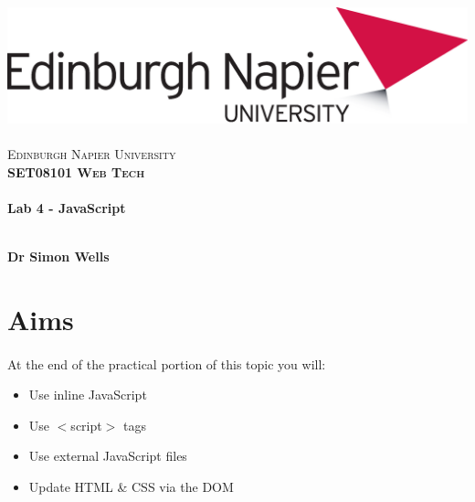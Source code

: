 \documentclass[10pt, a4paper, twosize]{article}
\begin{document}

\begin{titlepage}
\vspace*{5cm}
\begin{center}
\includegraphics[width=.5\textwidth]{images/EdNapUniLogoCMYK}~\\[1cm]

\textsc{\Large Edinburgh Napier University}\\[1.5cm]

\textsc{\LARGE \bfseries SET08101 Web Tech}\\[0.5cm]

\hrulefill \\[0.4cm]
{\huge \bfseries Lab 4 - JavaScript \\[0.4cm] }
\hrulefill \\[1.5cm]

\begin{minipage}{0.4\textwidth}
\begin{flushleft} \large
\textbf{Dr Simon Wells} \\
\end{flushleft}
\end{minipage}

\vfill

\end{center}
\end{titlepage}




%

\section{Aims}
\paragraph{} At the end of the practical portion of this topic you will:

\begin{itemize}
\item Use inline JavaScript
\item Use $<$script$>$ tags
\item Use external JavaScript files
\item Update HTML \& CSS via the DOM
\end{itemize}
\end{document}
